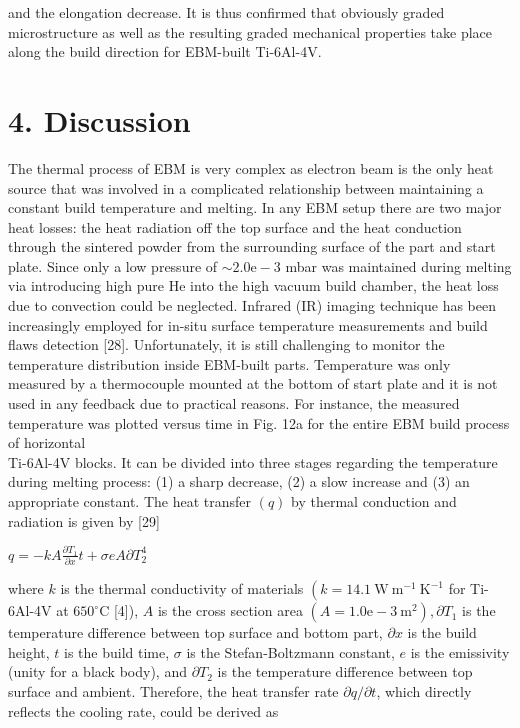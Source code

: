 \documentclass[10pt]{article}
\begin{document}
and the elongation decrease. It is thus confirmed that obviously graded microstructure as well as the resulting graded mechanical properties take place along the build direction for EBM-built Ti-6Al-4V.

\section*{4. Discussion}
The thermal process of EBM is very complex as electron beam is the only heat source that was involved in a complicated relationship between maintaining a constant build temperature and melting. In any EBM setup there are two major heat losses: the heat radiation off the top surface and the heat conduction through the sintered powder from the surrounding surface of the part and start plate. Since only a low pressure of $\sim 2.0 \mathrm{e}-3$ mbar was maintained during melting via introducing high pure He into the high vacuum build chamber, the heat loss due to convection could be neglected. Infrared (IR) imaging technique has been increasingly employed for in-situ surface temperature measurements and build flaws detection [28]. Unfortunately, it is still challenging to monitor the temperature distribution inside EBM-built parts. Temperature was only measured by a thermocouple mounted at the bottom of start plate and it is not used in any feedback due to practical reasons. For instance, the measured temperature was plotted versus time in Fig. 12a for the entire EBM build process of horizontal\\
Ti-6Al-4V blocks. It can be divided into three stages regarding the temperature during melting process: (1) a sharp decrease, (2) a slow increase and (3) an appropriate constant. The heat transfer $(q)$ by thermal conduction and radiation is given by [29]

$q=-k A \frac{\partial T_{1}}{\partial x} t+\sigma e A \partial T_{2}^{4}$

where $k$ is the thermal conductivity of materials $\left(k=14.1 \mathrm{~W} \mathrm{~m}^{-1} \mathrm{~K}^{-1}\right.$ for Ti-6Al-4V at $650^{\circ} \mathrm{C}$ [4]), $A$ is the cross section area $\left(A=1.0 \mathrm{e}-3 \mathrm{~m}^{2}\right), \partial T_{1}$ is the temperature difference between top surface and bottom part, $\partial x$ is the build height, $t$ is the build time, $\sigma$ is the Stefan-Boltzmann constant, $e$ is the emissivity (unity for a black body), and $\partial T_{2}$ is the temperature difference between top surface and ambient. Therefore, the heat transfer rate $\partial q / \partial t$, which directly reflects the cooling rate, could be derived as
\end{document}
